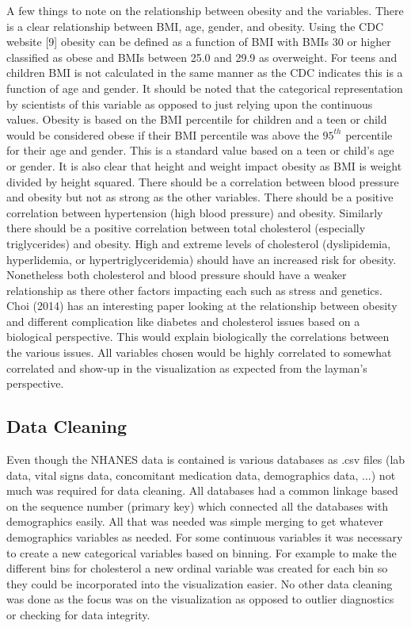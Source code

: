 \documentclass[12pt]{article}
\numberwithin{figure}{section}
\begin{document}
A few things to note on the relationship between obesity and the variables.  There is a clear relationship between BMI, age, gender, and obesity.  Using the CDC website [9] obesity can be defined as a function of BMI with BMIs 30 or higher classified as obese and BMIs between 25.0 and 29.9 as overweight.  For teens and children BMI is not calculated in the same manner as the CDC indicates this is a function of age and gender.  It should be noted that the categorical representation by scientists of this variable as opposed to just relying upon the continuous values.  Obesity is based on the BMI percentile for children and a teen or child would be considered obese if their BMI percentile was above the $95^{th}$ percentile for their age and gender.  This is a standard value based on a teen or child's age or gender.  It is also clear that height and weight impact obesity as BMI is weight divided by height squared.  There should be a correlation between blood pressure and obesity but not as strong as the other variables.  There should be a positive correlation between hypertension (high blood pressure) and obesity.  Similarly there should be a positive correlation between total cholesterol (especially triglycerides) and obesity.  High and extreme levels of cholesterol (dyslipidemia, hyperlidemia, or hypertriglyceridemia) should have an increased risk for obesity.  Nonetheless both cholesterol and blood pressure should have a weaker relationship as there other factors impacting each such as stress and genetics.  Choi (2014) has an interesting paper looking at the relationship between obesity and different complication like diabetes and cholesterol issues based on a biological perspective.  This would explain biologically the correlations between the various issues.  All variables chosen would be highly correlated to somewhat correlated and show-up in the visualization as expected from the layman's perspective.

{\subsection {Data Cleaning}}
Even though the NHANES data is contained is various databases as .csv files (lab data, vital signs data, concomitant medication data, demographics data, ...) not much was required for data cleaning.  All databases had a common linkage based on the sequence number (primary key) which connected all the databases with demographics easily.  All that was needed was simple merging to get whatever demographics variables as needed.  For some continuous variables it was necessary to create a new categorical variables based on binning.  For example to make the different bins for cholesterol a new ordinal variable was created for each bin so they could be incorporated into the visualization easier.  No other data cleaning was done as the focus was on the visualization as opposed to outlier diagnostics or checking for data integrity.
\end{document}

